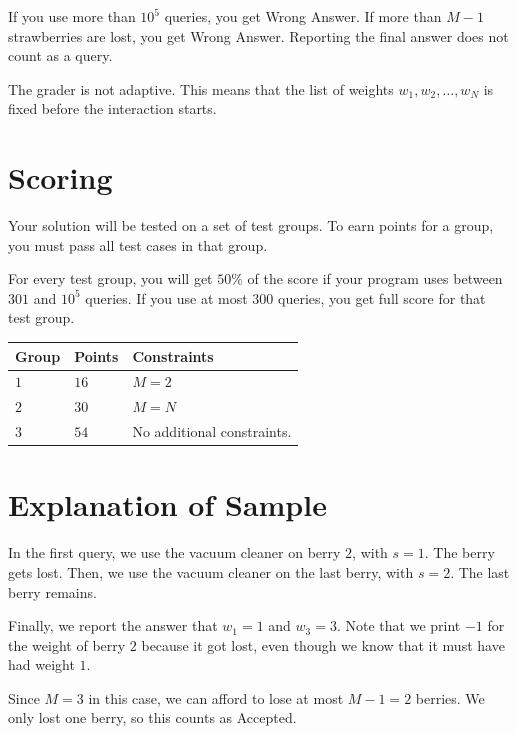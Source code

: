 If you use more than $10^5$ queries, you get Wrong Answer. If more than $M-1$ strawberries are lost, you get Wrong Answer. 
Reporting the final answer does not count as a query.

The grader is not adaptive. This means that the list of weights $w_1, w_2, \dots, w_N$ is fixed before the interaction starts.

\section*{Scoring}
Your solution will be tested on a set of test groups.
To earn points for a group, you must pass all test cases in that group.

For every test group, you will get $50\%$ of the score if your program uses between $301$ and 
$10^5$ queries. If you use at most $300$ queries, you get full score for that test group. 

\noindent
\begin{tabular}{| l | l | p{12cm} |}
  \hline
  \textbf{Group} & \textbf{Points} & \textbf{Constraints} \\ \hline
  $1$      & $16$      & $M = 2$  \\ \hline
  $2$      & $30$      & $M = N$ \\ \hline
  $3$      & $54$      & No additional constraints.  \\ \hline
\end{tabular}



\section*{Explanation of Sample}

In the first query, we use the vacuum cleaner on berry $2$, with $s = 1$. The berry gets lost. Then, we use the vacuum
cleaner on the last berry, with $s = 2$. The last berry remains.

Finally, we report the answer that $w_1 = 1$ and $w_3 = 3$. Note that we print $-1$ for the weight of berry $2$ 
because it got lost, even though we know that it must have had weight $1$.

Since $M = 3$ in this case, we can afford to lose at most $M-1 = 2$ berries. We only lost one berry, so this 
counts as Accepted.

